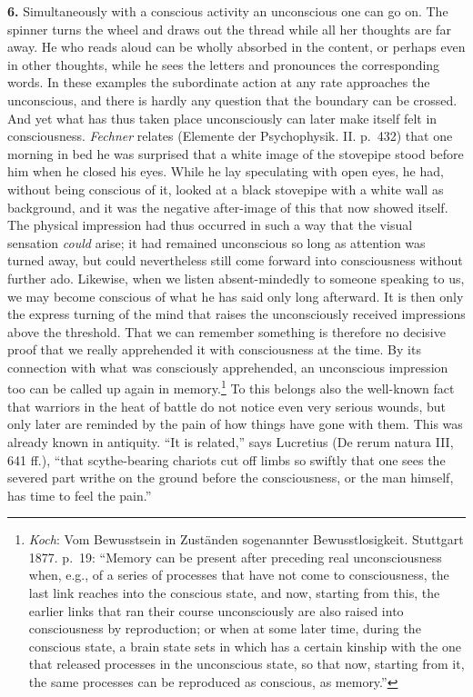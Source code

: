 \documentclass[12pt,a4paper]{book}
\newcommand{\opage}[1]{\marginnote{\footnotesize\textit{[#1]}}}
\begin{document}
\textbf{6.} Simultaneously with a conscious activity an unconscious one
can go on. The spinner turns the wheel and draws out the thread while all
her thoughts are far away. He who reads aloud can be wholly absorbed in
the content, or perhaps even in other thoughts, while he sees the letters
and pronounces the corresponding words. In these examples the subordinate
action at any rate approaches the unconscious, and there is hardly any
question that the boundary can be crossed. And yet what has thus taken
place unconsciously can later make itself felt in consciousness.
\emph{Fechner} relates (Elemente der Psychophysik. II. p.~432) that one
morning in bed he was surprised that a white image of the stovepipe stood
before him when he closed his eyes. While he lay speculating with open
eyes, he had, without being conscious of it, looked at a black stovepipe
with a white wall as background, and it was the negative after-image of
this that now showed itself. The physical impression had thus occurred in
such a way that the visual sensation \emph{could} arise; it had remained
unconscious so long as attention was turned away, but could nevertheless
still come forward into consciousness without further ado. Likewise,
when we listen absent-mindedly to someone speaking to us, we may become
conscious of what he has said only long afterward. It is then only the
express turning of the mind that raises the unconsciously received
impressions above the threshold. That we can remember something is
therefore no decisive proof that we really apprehended it with
consciousness at the time. By its connection with what was consciously
apprehended, an unconscious impression too can be called up again in
memory.\footnote{\emph{Koch}: Vom Bewusstsein in Zuständen sogenannter
Bewusstlosigkeit. Stuttgart 1877. p.~19: ``Memory can be present after
preceding real unconsciousness when, e.g., of a series of processes that
have not come to consciousness, the last link reaches into the conscious
state, and now, starting from this, the earlier links that ran their
course unconsciously are also raised into consciousness by reproduction;
or when at some later time, during the conscious state, a brain state
sets in which has a certain kinship with the one that released processes
in the unconscious state, so that now, starting from it, the same
processes can be reproduced as conscious, as memory.''} To this belongs
also the well-known
\opage{92}fact that warriors in the heat of battle do not notice even very
serious wounds, but only later are reminded by the pain of how things
have gone with them. This was already known in antiquity. ``It is
related,'' says Lucretius (De rerum natura III, 641 ff.), ``that
scythe-bearing chariots cut off limbs so swiftly that one sees the
severed part writhe on the ground before the consciousness, or the man
himself, has time to feel the pain.''
\end{document}

